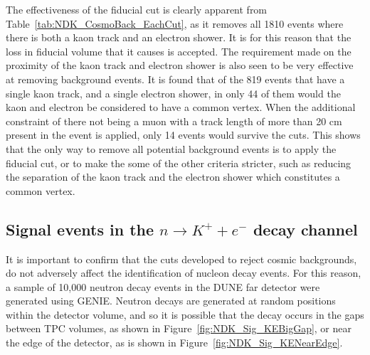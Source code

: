The effectiveness of the fiducial cut is clearly apparent from Table~\ref{tab:NDK_CosmoBack_EachCut}, as it removes all 1810 events where there is both a kaon track and an electron shower. It is for this reason that the loss in fiducial volume that it causes is accepted. The requirement made on the proximity of the kaon track and electron shower is also seen to be very effective at removing background events. It is found that of the 819 events that have a single kaon track, and a single electron shower, in only 44 of them would the kaon and electron be considered to have a common vertex. When the additional constraint of there not being a muon with a track length of more than 20 cm present in the event is applied, only 14 events would survive the cuts. This shows that the only way to remove all potential background events is to apply the fiducial cut, or to make the some of the other criteria stricter, such as reducing the separation of the kaon track and the electron shower which constitutes a common vertex. \\

\subsection{Signal events in the $n \rightarrow K^{+} + e^{-}$ decay channel} \label{sec:NDKSig}
It is important to confirm that the cuts developed to reject cosmic backgrounds, do not adversely affect the identification of nucleon decay events. For this reason, a sample of 10,000 neutron decay events in the DUNE far detector were generated using GENIE. Neutron decays are generated at random positions within the detector volume, and so it is possible that the decay occurs in the gaps between TPC volumes, as shown in Figure~\ref{fig:NDK_Sig_KEBigGap}, or near the edge of the detector, as is shown in Figure~\ref{fig:NDK_Sig_KENearEdge}. \\

